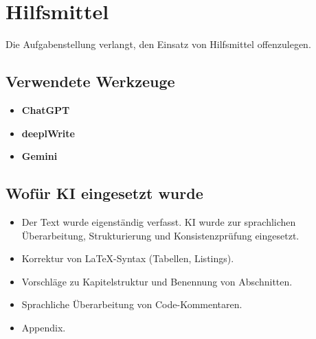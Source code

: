 \section{Hilfsmittel}
\label{app:hilfsmittel}

Die Aufgabenstellung verlangt, den Einsatz von Hilfsmittel
offenzulegen.

\subsection{Verwendete Werkzeuge}

\begin{itemize}
    \item \textbf{ChatGPT}
    \item \textbf{deeplWrite}
    \item \textbf{Gemini}
\end{itemize}

\subsection{Wofür KI eingesetzt wurde}

\begin{itemize}
    \item Der Text wurde eigenständig verfasst. KI wurde zur sprachlichen
          Überarbeitung, Strukturierung und Konsistenzprüfung eingesetzt.
    \item Korrektur von \LaTeX{}-Syntax (Tabellen, Listings).
    \item Vorschläge zu Kapitelstruktur und Benennung von Abschnitten.
    \item Sprachliche Überarbeitung von Code-Kommentaren.
    \item Appendix.
\end{itemize}


